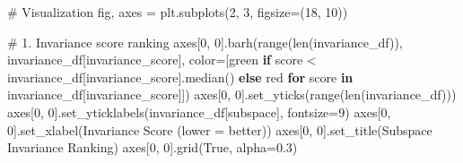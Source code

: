 \documentclass[
  letterpaper,
  DIV=11,
  numbers=noendperiod]{scrartcl}
\newenvironment{Shaded}{\begin{snugshade}}{\end{snugshade}}
\newcommand{\BuiltInTok}[1]{\textcolor[rgb]{0.00,0.23,0.31}{#1}}
\newcommand{\CommentTok}[1]{\textcolor[rgb]{0.37,0.37,0.37}{#1}}
\newcommand{\ControlFlowTok}[1]{\textcolor[rgb]{0.00,0.23,0.31}{\textbf{#1}}}
\newcommand{\DecValTok}[1]{\textcolor[rgb]{0.68,0.00,0.00}{#1}}
\newcommand{\FloatTok}[1]{\textcolor[rgb]{0.68,0.00,0.00}{#1}}
\newcommand{\KeywordTok}[1]{\textcolor[rgb]{0.00,0.23,0.31}{\textbf{#1}}}
\newcommand{\NormalTok}[1]{\textcolor[rgb]{0.00,0.23,0.31}{#1}}
\newcommand{\OperatorTok}[1]{\textcolor[rgb]{0.37,0.37,0.37}{#1}}
\newcommand{\StringTok}[1]{\textcolor[rgb]{0.13,0.47,0.30}{#1}}
\newcommand{\VariableTok}[1]{\textcolor[rgb]{0.07,0.07,0.07}{#1}}
\renewenvironment{Shaded}{%
  \begin{tcolorbox}[%
    enhanced,%
    colback=codebg,%
    colframe=codebg,%
    borderline west={3pt}{0pt}{sectionblue},%
    fontupper=\small\ttfamily,%
    boxrule=0pt,%
    arc=0pt,%
    boxsep=5pt,%
    left=2mm,%
    right=2mm,%
    top=2mm,%
    bottom=2mm%
  ]%
}{%
  \end{tcolorbox}%
}
\begin{document}
\begin{Shaded}
\begin{Highlighting}[]
\CommentTok{\# Visualization}
\NormalTok{fig, axes }\OperatorTok{=}\NormalTok{ plt.subplots(}\DecValTok{2}\NormalTok{, }\DecValTok{3}\NormalTok{, figsize}\OperatorTok{=}\NormalTok{(}\DecValTok{18}\NormalTok{, }\DecValTok{10}\NormalTok{))}

\CommentTok{\# 1. Invariance score ranking}
\NormalTok{axes[}\DecValTok{0}\NormalTok{, }\DecValTok{0}\NormalTok{].barh(}\BuiltInTok{range}\NormalTok{(}\BuiltInTok{len}\NormalTok{(invariance\_df)), invariance\_df[}\StringTok{\textquotesingle{}invariance\_score\textquotesingle{}}\NormalTok{], }
\NormalTok{               color}\OperatorTok{=}\NormalTok{[}\StringTok{\textquotesingle{}green\textquotesingle{}} \ControlFlowTok{if}\NormalTok{ score }\OperatorTok{\textless{}}\NormalTok{ invariance\_df[}\StringTok{\textquotesingle{}invariance\_score\textquotesingle{}}\NormalTok{].median() }\ControlFlowTok{else} \StringTok{\textquotesingle{}red\textquotesingle{}} 
                      \ControlFlowTok{for}\NormalTok{ score }\KeywordTok{in}\NormalTok{ invariance\_df[}\StringTok{\textquotesingle{}invariance\_score\textquotesingle{}}\NormalTok{]])}
\NormalTok{axes[}\DecValTok{0}\NormalTok{, }\DecValTok{0}\NormalTok{].set\_yticks(}\BuiltInTok{range}\NormalTok{(}\BuiltInTok{len}\NormalTok{(invariance\_df)))}
\NormalTok{axes[}\DecValTok{0}\NormalTok{, }\DecValTok{0}\NormalTok{].set\_yticklabels(invariance\_df[}\StringTok{\textquotesingle{}subspace\textquotesingle{}}\NormalTok{], fontsize}\OperatorTok{=}\DecValTok{9}\NormalTok{)}
\NormalTok{axes[}\DecValTok{0}\NormalTok{, }\DecValTok{0}\NormalTok{].set\_xlabel(}\StringTok{\textquotesingle{}Invariance Score (lower = better)\textquotesingle{}}\NormalTok{)}
\NormalTok{axes[}\DecValTok{0}\NormalTok{, }\DecValTok{0}\NormalTok{].set\_title(}\StringTok{\textquotesingle{}Subspace Invariance Ranking\textquotesingle{}}\NormalTok{)}
\NormalTok{axes[}\DecValTok{0}\NormalTok{, }\DecValTok{0}\NormalTok{].grid(}\VariableTok{True}\NormalTok{, alpha}\OperatorTok{=}\FloatTok{0.3}\NormalTok{)}


\end{Highlighting}
\end{Shaded}
\end{document}
